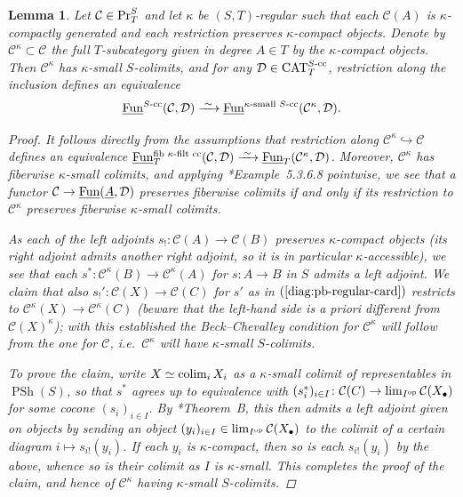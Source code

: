 \documentclass[reqno]{memo-l}
\theoremstyle{mythm}
\newtheorem{lemma}[thm]{Lemma}
\theoremstyle{definition}
\numberwithin{equation}{section}
\newcommand{\Cc}{{\mathcal{C}}}
\newcommand{\Dd}{{\mathcal{D}}}
\DeclareMathOperator{\CAT}{CAT}
\newcommand{\Fun}{{\textup{Fun}}}
\DeclareMathOperator{\PSh}{PSh}
\newcommand{\op}{{\textup{op}}}
\newcommand{\colim}{\mathop{\textup{colim}}}
\renewcommand{\Pr}{\textup{Pr}}
\newcommand{\ulhelper}[2]{\underline{\setbox0=\hbox{$#1#2$}\dp0=0.4pt \box0\relax}}
\newcommand{\ul}[1]{{\mathpalette\ulhelper{#1}}\hbox{\rule[-2pt]{0pt}{0pt}}}
\newcommand{\iso}{\xrightarrow{\;\smash{\raisebox{-0.25ex}{\ensuremath{\scriptstyle\sim}}}\;}}
\begin{document}
\begin{lemma}\label{lemma:fiberwise-kappa-compactly-gen}
    Let $\Cc\in\Pr^S_T$ and let $\kappa$ be $(S,T)$-regular such that each $\Cc(A)$ is $\kappa$-compactly generated and each restriction preserves $\kappa$-compact objects. 
    Denote by $\Cc^{\kappa}\subset \Cc$ the full $T$-subcategory given in degree $A\in T$ by the $\kappa$-compact objects. 
    Then $\Cc^\kappa$ has $\kappa$-small $S$-colimits, and for any $\Dd\in\CAT_T^\textup{$S$-cc}$, restriction along the inclusion defines an equivalence
    \[
        \ul\Fun^\textup{$S$-cc}(\Cc,\Dd)\iso\ul\Fun^\textup{$\kappa$-small $S$-cc}(\Cc^\kappa,\Dd). 
    \]
    \begin{proof}
        It follows directly from the assumptions that restriction along $\Cc^\kappa\hookrightarrow\Cc$ defines an equivalence $\ul\Fun_T^\text{fib $\kappa$-filt cc}(\Cc,\Dd)\iso\ul\Fun_T(\Cc^\kappa,\Dd)$. Moreover, $\Cc^\kappa$ has fiberwise $\kappa$-small colimits, and applying \cite{HTT}*{Example~5.3.6.8} pointwise, we see that a functor $\Cc\to\ul\Fun(\ul A,\Dd)$ preserves fiberwise colimits if and only if its restriction to $\Cc^\kappa$ preserves fiberwise $\kappa$-small colimits. 

        As each of the left adjoints $s_!\colon\Cc(A)\to\Cc(B)$ preserves $\kappa$-compact objects (its right adjoint admits another right adjoint, so it is in particular $\kappa$-accessible), we see that each $s^*\colon\Cc^\kappa(B)\to\Cc^\kappa(A)$ for $s\colon A\to B$ in $S$ admits a left adjoint. We claim that also $s_!'\colon\Cc(X)\to\Cc(C)$ for $s'$ as in $(\ref{diag:pb-regular-card})$ restricts to $\Cc^\kappa(X)\to\Cc^\kappa(C)$ (beware that the left-hand side is a priori different from $\Cc(X)^\kappa$); with this established the Beck--Chevalley condition for $\Cc^\kappa$ will follow from the one for $\Cc$, i.e.~$\Cc^\kappa$ will have $\kappa$-small $S$-colimits.

        To prove the claim, write $X\simeq\colim_iX_i$ as a $\kappa$-small colimit of representables in $\PSh(S)$, so that $s^*$ agrees up to equivalence with $(s_i^*)_{i\in I}\colon\Cc(C)\to\lim_{I^\op}\Cc(X_\bullet)$ for some cocone $(s_i)_{i\in I}$. By \cite{descent-lim}*{Theorem~B}, this then admits a left adjoint given on objects by sending an object $(y_i)_{i\in I}\in\lim_{I^\op}\Cc(X_\bullet)$ to the colimit of a certain diagram $i\mapsto s_{i!}(y_i)$. If each $y_i$ is $\kappa$-compact, then so is each $s_{i!}(y_i)$ by the above, whence so is their colimit as $I$ is $\kappa$-small. This completes the proof of the claim, and hence of $\Cc^\kappa$ having $\kappa$-small $S$-colimits.


\end{proof}
\end{lemma}
\end{document}
